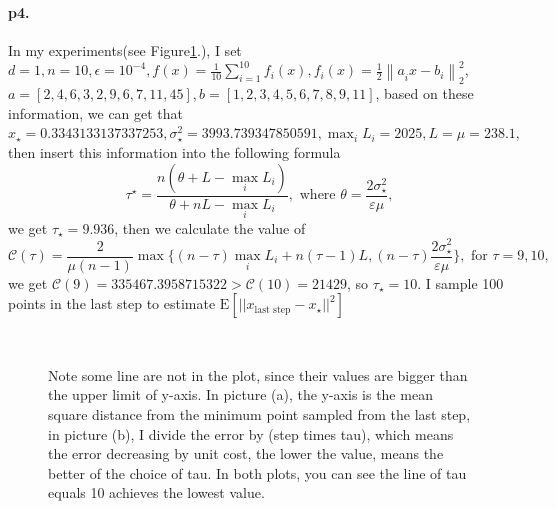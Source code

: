 \documentclass[12pt,a4paper]{article}
\begin{document}
\paragraph{p4.}
In my experiments(see Figure\ref{img2}.), I set $d = 1, n = 10, \epsilon = 10^{-4},  f(x)=\frac{1}{ 10} \sum_{i=1}^{10} f_i(x), f_i(x) = \frac{1}{2}\left\|a_{i}^{} x-b_{i}\right\|_{2}^{2}$, $a = [2,4,6,3,2,9,6,7,11,45], b = [1,2,3,4,5,6,7,8,9,11]$, based on these information, we can get that $x_{\star} = 0.3343133137337253, \sigma_{\star}^2 = 3993.739347850591, \max_{i} L_i = 2025, L = \mu = 238.1, $ then insert this information into the following formula 
\begin{equation*}
	\tau^{\star}=\frac{n\left(\theta+L-\max _{i} L_{i}\right)}{\theta+n L-\max _{i} L_{i}}, \text{ where } \theta=\frac{2 \sigma_{\star}^{2}}{\varepsilon \mu},
\end{equation*}
we get $\tau_{\star} = 9.936$, then we calculate the value of 
$$\mathcal{C}(\tau) \stackrel{}{=} \frac{2}{\mu(n-1)} \max \{(n-\tau) \max _{i} L_{i}+n(\tau-1) L, (n-\tau) \frac{2 \sigma_{\star}^{2}}{\varepsilon \mu}\}, \text{  for }\tau = 9,10,$$
we get $\mathcal{C}(9)= 335467.3958715322>\mathcal{C}(10) = 21429$, so $\tau_{\star} = 10.$ I sample 100 points in the last step to estimate $\mathrm{E}\left[||x_{\text{last step}}-x_{\star}||^2\right]$
\begin{figure}
	\centering
	\\ %
	
	
	\caption{ Note some line are not in the plot, since their values are bigger than the upper limit of y-axis. In picture (a), the y-axis is the mean square distance from the minimum point sampled from the last step, in picture (b), I divide the error by (step times tau), which means the error decreasing by unit cost, the lower the value, means the better of the choice of tau. In both plots, you can see the line of tau equals 10 achieves the lowest value. } %
	\label{img2}
\end{figure}
\end{document}
